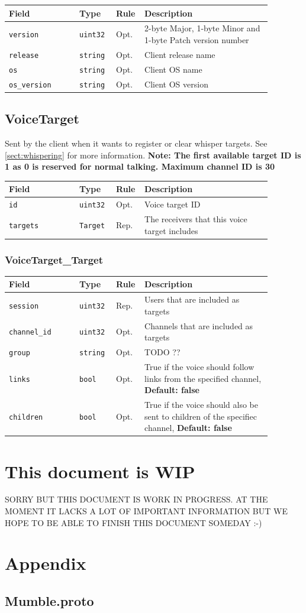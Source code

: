 \documentclass[11pt]{article} %
\newenvironment{mumbleMessageEx}
{%
	\small
	\renewcommand\arraystretch{1.5}
	\begin{tabular}{p{0.25\linewidth}p{0.13\linewidth}p{0.05\linewidth}p{0.45\linewidth}}
	Field & Type & Rule & Description \\
	\hline
}
{%
	\end{tabular}
	\renewcommand\arraystretch{1.0}
}
\newcommand{\mumbleMessageExItem}[4]{ \texttt{#1} & \texttt{#2} & #3 & #4 \\ }
\begin{document}
\begin{mumbleMessageEx}
\mumbleMessageExItem{version}{uint32}{Opt.}{2-byte Major, 1-byte Minor and 1-byte Patch version number}
\mumbleMessageExItem{release}{string}{Opt.}{Client release name}
\mumbleMessageExItem{os}{string}{Opt.}{Client OS name}
\mumbleMessageExItem{os\_version}{string}{Opt.}{Client OS version}
\end{mumbleMessageEx}

\subsection{VoiceTarget}
\label{msg:voiceTarget}

Sent by the client when it wants to register or clear whisper targets. See \ref{sect:whispering} for more information. \textbf{Note: The first available target ID is 1 as 0 is reserved for normal talking. Maximum channel ID is 30}

\begin{mumbleMessageEx}
\mumbleMessageExItem{id}{uint32}{Opt.}{Voice target ID}
\mumbleMessageExItem{targets}{Target}{Rep.}{The receivers that this voice target includes}
\end{mumbleMessageEx}

\subsubsection{VoiceTarget\_Target}
\label{msg:voiceTarget:target}

\begin{mumbleMessageEx}
\mumbleMessageExItem{session}{uint32}{Rep.}{Users that are included as targets}
\mumbleMessageExItem{channel\_id}{uint32}{Opt.}{Channels that are included as targets}
\mumbleMessageExItem{group}{string}{Opt.}{TODO ??}
\mumbleMessageExItem{links}{bool}{Opt.}{True if the voice should follow links from the specified channel, \textbf{Default: false}}
\mumbleMessageExItem{children}{bool}{Opt.}{True if the voice should also be sent to children of the specifiec channel, \textbf{Default: false}}
\end{mumbleMessageEx}




\section {This document is WIP}
SORRY BUT THIS DOCUMENT IS WORK IN PROGRESS. AT THE MOMENT IT LACKS A LOT OF IMPORTANT INFORMATION BUT WE HOPE TO BE ABLE TO FINISH THIS DOCUMENT SOMEDAY :-)

\appendix
\section{Appendix}
\subsection{Mumble.proto}
\label{appendix:mumble_proto}
\end{document}
